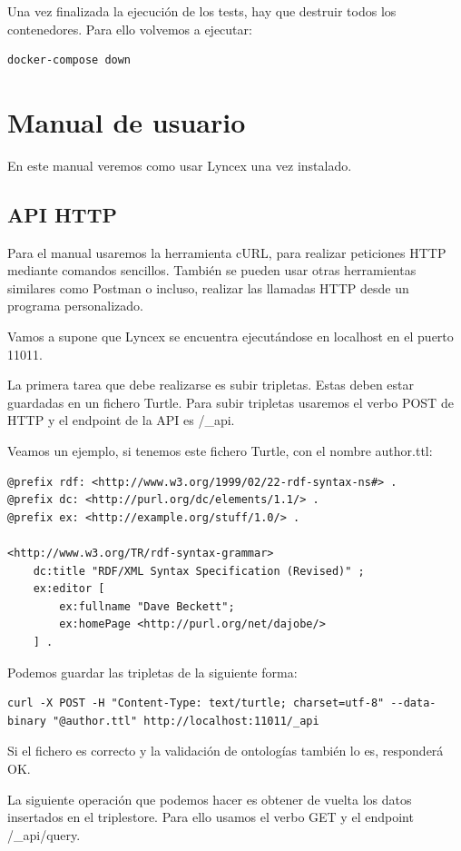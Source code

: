 \documentclass[12pt]{report} %
\begin{document}
Una vez finalizada la ejecución de los tests, hay que destruir todos los contenedores. Para ello volvemos a ejecutar:
\begin{verbatim}
docker-compose down
\end{verbatim}

\section{Manual de usuario}

En este manual veremos como usar Lyncex una vez instalado. 

\subsection{API HTTP}
Para el manual usaremos la herramienta cURL, para realizar peticiones HTTP mediante comandos sencillos. También se pueden usar otras herramientas similares como Postman o incluso, realizar las llamadas HTTP desde un programa personalizado.

Vamos a supone que Lyncex se encuentra ejecutándose en localhost en el puerto 11011.

La primera tarea que debe realizarse es subir tripletas. Estas deben estar guardadas en un fichero Turtle. Para subir tripletas usaremos el verbo POST de HTTP y el endpoint de la API es /\_api.

Veamos un ejemplo, si tenemos este fichero Turtle, con el nombre author.ttl:

\begin{lstlisting}
@prefix rdf: <http://www.w3.org/1999/02/22-rdf-syntax-ns#> .
@prefix dc: <http://purl.org/dc/elements/1.1/> .
@prefix ex: <http://example.org/stuff/1.0/> .

<http://www.w3.org/TR/rdf-syntax-grammar>
    dc:title "RDF/XML Syntax Specification (Revised)" ;
    ex:editor [
        ex:fullname "Dave Beckett";
        ex:homePage <http://purl.org/net/dajobe/>
    ] .
\end{lstlisting}

Podemos guardar las tripletas de la siguiente forma:
\begin{verbatim}
curl -X POST -H "Content-Type: text/turtle; charset=utf-8" --data-binary "@author.ttl" http://localhost:11011/_api
\end{verbatim}

Si el fichero es correcto y la validación de ontologías también lo es, responderá OK.

La siguiente operación que podemos hacer es obtener de vuelta los datos insertados en el triplestore. Para ello usamos el verbo GET y el endpoint /\_api/query.
\end{document}
